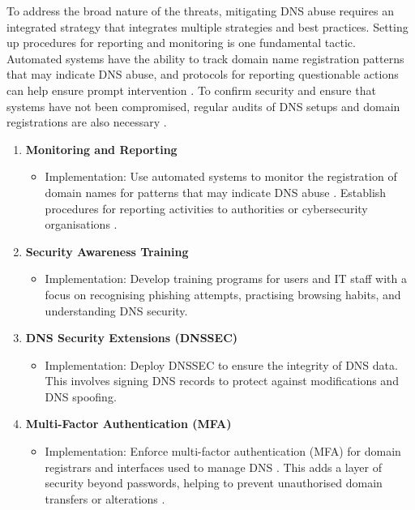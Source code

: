 To address the broad nature of the threats, mitigating DNS abuse requires an integrated strategy that integrates multiple strategies and best practices. Setting up procedures for reporting and monitoring is one fundamental tactic. Automated systems have the ability to track domain name registration patterns that may indicate DNS abuse, and protocols for reporting questionable actions can help ensure prompt intervention \cite{icannndnssec}. To confirm security and ensure that systems have not been compromised, regular audits of DNS setups and domain registrations are also necessary \cite{lucas2021tls} .

\begin{enumerate}
    \item \textbf{Monitoring and Reporting}
    \begin{itemize}
        \item Implementation: Use automated systems to monitor the registration of domain names for patterns that may indicate DNS abuse \cite{icannndnssec}. Establish procedures for reporting activities to authorities or cybersecurity organisations \cite{lucas2021tls}.
    \end{itemize}
    \item \textbf{Security Awareness Training}
    \begin{itemize}
        \item Implementation: Develop training programs for users and IT staff with a focus on recognising phishing attempts, practising browsing habits, and understanding DNS security.
    \end{itemize}
    \item \textbf{DNS Security Extensions (DNSSEC)}
    \begin{itemize}
        \item Implementation: Deploy DNSSEC to ensure the integrity of DNS data. This involves signing DNS records to protect against modifications and DNS spoofing.
    \end{itemize}
    \item \textbf{Multi-Factor Authentication (MFA)}
    \begin{itemize}
        \item Implementation: Enforce multi-factor authentication (MFA) for domain registrars and interfaces used to manage DNS \cite{icannndnssec}. This adds a layer of security beyond passwords, helping to prevent unauthorised domain transfers or alterations \cite{moghaddam2014ecco}.
    \end{itemize}

\end{enumerate}
